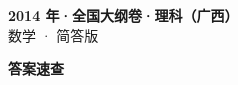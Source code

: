 \documentclass[zihao=-4, a4paper]{ctexart}
\begin{document}
\begin{center}
  {\Large\bfseries 2014 年·全国大纲卷·理科（广西）}\\[4pt]
  {\large 数学 · 简答版}
\end{center}
\medskip
{}

\clearpage
{}
\begin{center}{\Large\bfseries 答案速查}\end{center}
\medskip

\end{document}
